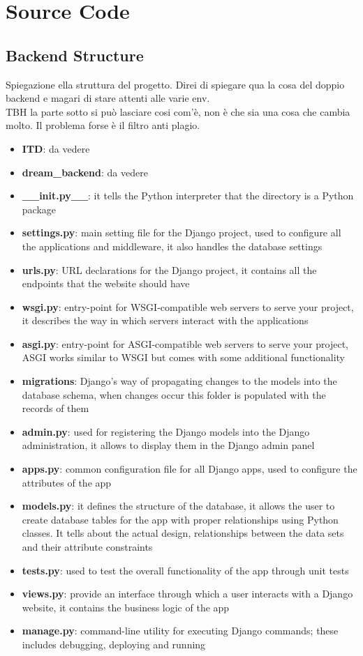 \documentclass[table, 12pt]{article}
\begin{document}
\section{Source Code}
\subsection{Backend Structure}
Spiegazione ella struttura del progetto. Direi di spiegare qua la cosa del doppio backend e magari di stare attenti alle varie env.\\
TBH la parte sotto si può lasciare cosi com'è, non è che sia una cosa che cambia molto. Il problema forse è il filtro anti plagio.
\begin{itemize}
    \item \textbf{ITD}: da vedere
    \item \textbf{dream\_backend}: da vedere
    \item \textbf{\_\_init.py\_\_}: it tells the Python interpreter that the directory is a Python package
    \item \textbf{settings.py}: main setting file for the Django project, used to configure all the applications and middleware, it also handles the database settings
    \item \textbf{urls.py}: URL declarations for the Django project, it contains all the endpoints that the website should have
    \item \textbf{wsgi.py}: entry-point for WSGI-compatible web servers to serve your project, it describes the way in which servers interact with the applications
    \item \textbf{asgi.py}: entry-point for ASGI-compatible web servers to serve your project, ASGI works similar to WSGI but comes with some additional functionality
    \item \textbf{migrations}: Django's way of propagating changes to the models into the database schema, when changes occur this folder is populated with the records of them
    \item \textbf{admin.py}: used for registering the Django models into the Django administration, it allows to display them in the Django admin panel
    \item \textbf{apps.py}: common configuration file for all Django apps, used to configure the attributes of the app
    \item \textbf{models.py}: it defines the structure of the database, it allows the user to create database tables for the app with proper relationships using Python classes. It tells about the actual design, relationships between the data sets and their attribute constraints
    \item \textbf{tests.py}: used to test the overall functionality of the app through unit tests
    \item \textbf{views.py}: provide an interface through which a user interacts with a Django website, it contains the business logic of the app
    \item \textbf{manage.py}: command-line utility for executing Django commands; these includes debugging, deploying and running
\end{itemize}
\end{document}
